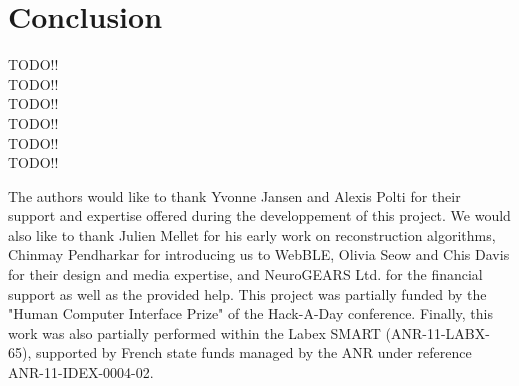 \documentclass[sigchi]{acmart}
\begin{document}
\section{Conclusion}

TODO!! \\
TODO!! \\
TODO!! \\
TODO!! \\
TODO!! \\
TODO!! \\


\begin{acks}
The authors would like to thank Yvonne Jansen and Alexis Polti for their support and expertise offered during the developpement of this project. We would also like to thank Julien Mellet for his early work on reconstruction algorithms, Chinmay Pendharkar for introducing us to WebBLE, Olivia Seow and Chis Davis for their design and media expertise, and NeuroGEARS Ltd. for the financial support as well as the provided help. This project was partially funded by the "Human Computer Interface Prize" of the Hack-A-Day conference. Finally, this work was also partially performed within the Labex SMART (ANR-11-LABX-65), supported by French state funds managed by the ANR under reference ANR-11-IDEX-0004-02.
\end{acks}




\end{document}
